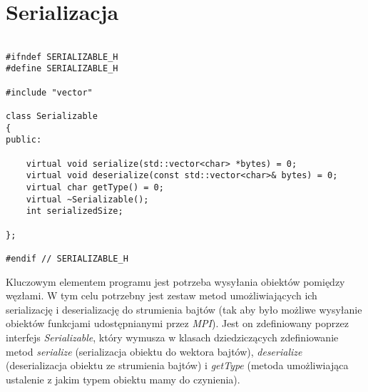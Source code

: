 \section{Serializacja}

\begin{lstlisting}

#ifndef SERIALIZABLE_H
#define SERIALIZABLE_H

#include "vector"

class Serializable
{
public:

    virtual void serialize(std::vector<char> *bytes) = 0;
    virtual void deserialize(const std::vector<char>& bytes) = 0;
    virtual char getType() = 0;
    virtual ~Serializable();
    int serializedSize;

};

#endif // SERIALIZABLE_H

\end{lstlisting}

Kluczowym elementem programu jest potrzeba wysyłania obiektów pomiędzy węzłami. W tym celu potrzebny jest zestaw metod umożliwiających ich serializację i deserializację do strumienia bajtów (tak aby było możliwe wysyłanie obiektów funkcjami udostępnianymi przez \emph{MPI}). Jest on zdefiniowany poprzez interfejs \emph{Serializable}, który wymusza w klasach dziedziczących zdefiniowanie metod \emph{serialize} (serializacja obiektu do wektora bajtów), \emph{deserialize} (deserializacja obiektu ze strumienia bajtów) i \emph{getType} (metoda umożliwiająca ustalenie z jakim typem obiektu mamy do czynienia).